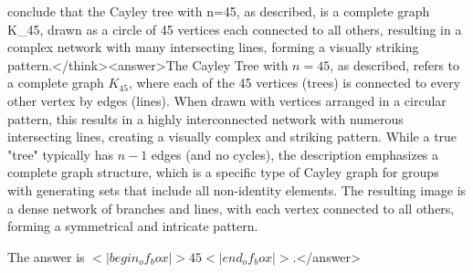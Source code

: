 conclude that the Cayley tree with n=45, as described, is a complete graph K_45, drawn as a circle of 45 vertices each connected to all others, resulting in a complex network with many intersecting lines, forming a visually striking pattern.</think><answer>The Cayley Tree with \( n = 45 \), as described, refers to a complete graph \( K_{45} \), where each of the 45 vertices (trees) is connected to every other vertex by edges (lines). When drawn with vertices arranged in a circular pattern, this results in a highly interconnected network with numerous intersecting lines, creating a visually complex and striking pattern. While a true "tree" typically has \( n - 1 \) edges (and no cycles), the description emphasizes a complete graph structure, which is a specific type of Cayley graph for groups with generating sets that include all non-identity elements. The resulting image is a dense network of branches and lines, with each vertex connected to all others, forming a symmetrical and intricate pattern.  

The answer is \(<|begin_of_box|>45<|end_of_box|>\).</answer>